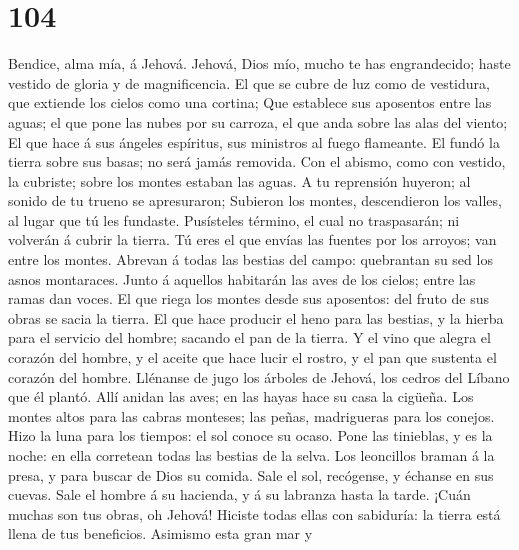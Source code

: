 \hypertarget{section-103}{%
\section{104}\label{section-103}}

 Bendice, alma mía, á Jehová. Jehová, Dios mío, mucho te
has engrandecido; haste vestido de gloria y de magnificencia.
 El que se cubre de luz como de vestidura, que extiende
los cielos como una cortina;  Que establece sus aposentos
entre las aguas; el que pone las nubes por su carroza, el que anda sobre
las alas del viento;  El que hace á sus ángeles espíritus,
sus ministros al fuego flameante.  El fundó la tierra
sobre sus basas; no será jamás removida.  Con el abismo,
como con vestido, la cubriste; sobre los montes estaban las aguas.
 A tu reprensión huyeron; al sonido de tu trueno se
apresuraron;  Subieron los montes, descendieron los
valles, al lugar que tú les fundaste.  Pusísteles término,
el cual no traspasarán; ni volverán á cubrir la tierra. 
Tú eres el que envías las fuentes por los arroyos; van entre los montes.
 Abrevan á todas las bestias del campo: quebrantan su sed
los asnos montaraces.  Junto á aquellos habitarán las
aves de los cielos; entre las ramas dan voces.  El que
riega los montes desde sus aposentos: del fruto de sus obras se sacia la
tierra.  El que hace producir el heno para las bestias, y
la hierba para el servicio del hombre; sacando el pan de la tierra.
 Y el vino que alegra el corazón del hombre, y el aceite
que hace lucir el rostro, y el pan que sustenta el corazón del hombre.
 Llénanse de jugo los árboles de Jehová, los cedros del
Líbano que él plantó.  Allí anidan las aves; en las hayas
hace su casa la cigüeña.  Los montes altos para las
cabras monteses; las peñas, madrigueras para los conejos.
 Hizo la luna para los tiempos: el sol conoce su ocaso.
 Pone las tinieblas, y es la noche: en ella corretean
todas las bestias de la selva.  Los leoncillos braman á
la presa, y para buscar de Dios su comida.  Sale el sol,
recógense, y échanse en sus cuevas.  Sale el hombre á su
hacienda, y á su labranza hasta la tarde.  ¡Cuán muchas
son tus obras, oh Jehová! Hiciste todas ellas con sabiduría: la tierra
está llena de tus beneficios.  Asimismo esta gran mar y
